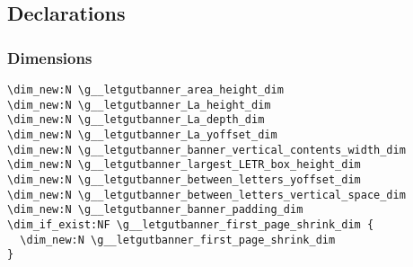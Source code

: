 \documentclass{letgut}
\begin{document}
\subsection{Declarations}
\label{sec:orgbda0ae2}

\subsubsection{Dimensions}
\label{sec:org5711d86}

\begin{lstlisting}
\dim_new:N \g__letgutbanner_area_height_dim
\dim_new:N \g__letgutbanner_La_height_dim
\dim_new:N \g__letgutbanner_La_depth_dim
\dim_new:N \g__letgutbanner_La_yoffset_dim
\dim_new:N \g__letgutbanner_banner_vertical_contents_width_dim
\dim_new:N \g__letgutbanner_largest_LETR_box_height_dim
\dim_new:N \g__letgutbanner_between_letters_yoffset_dim
\dim_new:N \g__letgutbanner_between_letters_vertical_space_dim
\dim_new:N \g__letgutbanner_banner_padding_dim
\dim_if_exist:NF \g__letgutbanner_first_page_shrink_dim {
  \dim_new:N \g__letgutbanner_first_page_shrink_dim
}
\end{lstlisting}
\end{document}
